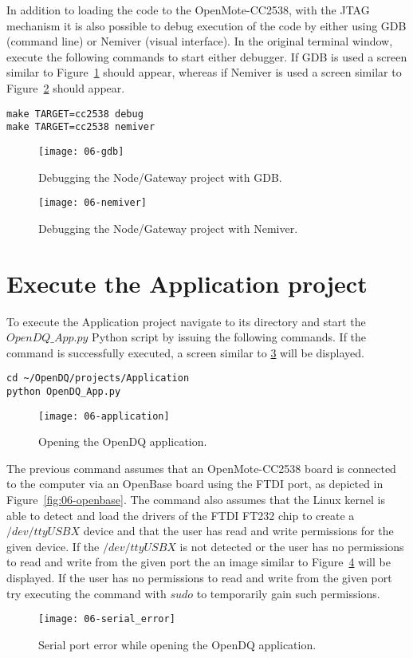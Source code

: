 In addition to loading the code to the OpenMote-CC2538, with the JTAG mechanism it is also possible to debug execution of the code by either using GDB (command line) or Nemiver (visual interface). In the original terminal window, execute the following commands to start either debugger. If GDB is used a screen similar to Figure~\ref{fig:06-gdb} should appear, whereas if Nemiver is used a screen similar to Figure~\ref{fig:06-nemiver} should appear.

\begin{verbatim}
make TARGET=cc2538 debug
make TARGET=cc2538 nemiver
\end{verbatim}

\begin{figure}[!ht]
    \centering
	\texttt{[image: 06-gdb]}
    \caption{Debugging the Node/Gateway project with GDB.}
    \label{fig:06-gdb}
\end{figure}

\begin{figure}[!ht]
    \centering
	\texttt{[image: 06-nemiver]}
    \caption{Debugging the Node/Gateway project with Nemiver.}
    \label{fig:06-nemiver}
\end{figure}

\label{sec:06-software}
\section{Execute the Application project}
To execute the Application project navigate to its directory and start the $OpenDQ\_App.py$ Python script by issuing the following commands. If the command is successfully executed, a screen similar to \ref{fig:06-application} will be displayed.

\begin{verbatim}
cd ~/OpenDQ/projects/Application
python OpenDQ_App.py
\end{verbatim}

\begin{figure}[!ht]
    \centering
	\texttt{[image: 06-application]}
    \caption{Opening the OpenDQ application.}
    \label{fig:06-application}
\end{figure}

The previous command assumes that an OpenMote-CC2538 board is connected to the computer via an OpenBase board using the FTDI port, as depicted in Figure~\ref{fig:06-openbase}. The command also assumes that the Linux kernel is able to detect and load the drivers of the FTDI FT232 chip to create a $/dev/ttyUSBX$ device and that the user has read and write permissions for the given device. If the $/dev/ttyUSBX$ is not detected or the user has no permissions to read and write from the given port the an image similar to Figure~\ref{fig:06-serial_error} will be displayed. If the user has no permissions to read and write from the given port try executing the command with $sudo$ to temporarily gain such permissions.

\begin{figure}[!ht]
    \centering
	\texttt{[image: 06-serial\_error]}
    \caption{Serial port error while opening the OpenDQ application.}
    \label{fig:06-serial_error}
\end{figure}